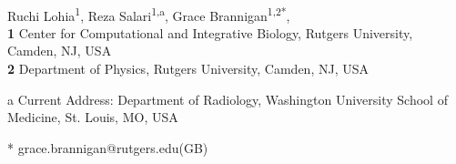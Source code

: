 \documentclass[10pt,letterpaper]{article}
\begin{document}
\vspace*{0.2in}

\begin{flushleft}
{\Large
\textbf{} %
}
\newline
\\
Ruchi Lohia\textsuperscript{1},
Reza Salari\textsuperscript{1,a},
Grace Brannigan\textsuperscript{1,2*},
\\
\bigskip
\textbf{1} Center for Computational and Integrative Biology, Rutgers University, Camden, NJ, USA
\\
\textbf{2} Department of Physics, Rutgers University, Camden, NJ, USA
\\
\bigskip

% 
%


\textcurrency a Current Address: Department of Radiology, Washington University School of Medicine, St. Louis, MO, USA



* grace.brannigan@rutgers.edu(GB)

\end{flushleft}
\end{document}
